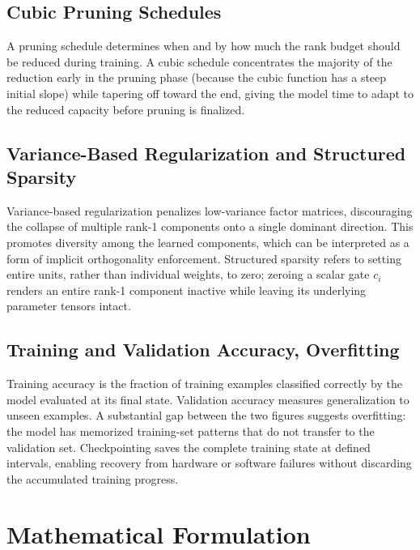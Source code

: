 \documentclass[conference]{IEEEtran}
\begin{document}
\subsection{Cubic Pruning Schedules}
A pruning schedule determines when and by how much the rank
budget should be reduced during training. A cubic schedule
concentrates the majority of the reduction early in the
pruning phase (because the cubic function has a steep initial
slope) while tapering off toward the end, giving the model
time to adapt to the reduced capacity before pruning is
finalized.

\subsection{Variance-Based Regularization and Structured
Sparsity}
Variance-based regularization penalizes low-variance factor
matrices, discouraging the collapse of multiple rank-1
components onto a single dominant direction. This promotes
diversity among the learned components, which can be
interpreted as a form of implicit orthogonality enforcement.
Structured sparsity refers to setting entire units, rather
than individual weights, to zero; zeroing a scalar gate $c_i$
renders an entire rank-1 component inactive while leaving its
underlying parameter tensors intact.

\subsection{Training and Validation Accuracy, Overfitting}
Training accuracy is the fraction of training examples
classified correctly by the model evaluated at its final
state. Validation accuracy measures generalization to unseen
examples. A substantial gap between the two figures suggests
overfitting: the model has memorized training-set patterns
that do not transfer to the validation set. Checkpointing
saves the complete training state at defined intervals,
enabling recovery from hardware or software failures without
discarding the accumulated training progress.

\section{Mathematical Formulation}
\label{sec:math}
\end{document}
